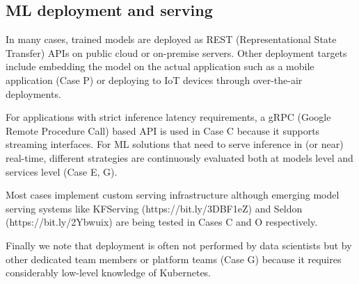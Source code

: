 

\subsection{ML deployment and serving}
In many cases, trained models are deployed as REST (Representational State Transfer) APIs on public cloud or on-premise servers. Other deployment targets include embedding the model on the actual application  such as a mobile application (Case P) or deploying to IoT devices through over-the-air deployments.

For applications with strict inference latency requirements, a gRPC (Google Remote Procedure Call) based API is used in Case C because it supports streaming interfaces. For ML solutions that need to serve inference in (or near) real-time, different strategies are continuously evaluated both at models level and services level (Case E, G). 

Most cases implement custom serving infrastructure although emerging model serving systems like KFServing (https://bit.ly/3DBF1eZ) and Seldon (https://bit.ly/2Ybwuix) are being tested in Cases C and O respectively. 

Finally we note that deployment is often not performed by data scientists but by other dedicated team members or platform teams (Case G) because it requires considerably low-level knowledge of Kubernetes.




